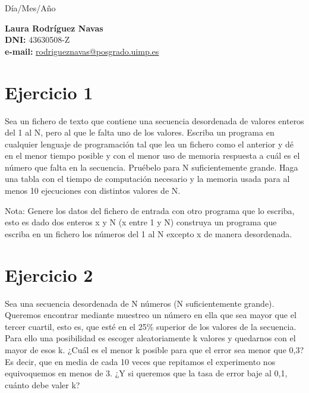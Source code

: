 \documentclass{uimppracticas}
\begin{document}
	
\frontmatter


\begin{center}
	\large Día/Mes/Año
\end{center}

\vspace{30mm}

\begin{flushright}
	{\bf Laura Rodríguez Navas}\\
	\textbf{DNI:} 43630508-Z\\
	\textbf{e-mail:} \href{rodrigueznavas@posgrado.uimp.es}{rodrigueznavas@posgrado.uimp.es}
\end{flushright}

\newpage

\tableofcontents

\newpage

\mainmatter

\section{Ejercicio 1}

Sea un fichero de texto que contiene una secuencia desordenada de valores enteros del 1 al N, pero al que le falta uno de los valores. Escriba un programa en cualquier lenguaje de programación tal que lea un fichero como el anterior y dé en el menor tiempo posible y con el menor uso de memoria respuesta a cuál es el número que falta en la secuencia. Pruébelo para N suficientemente grande. Haga una tabla con el tiempo de computación necesario y la memoria usada para al menos 10 ejecuciones con distintos valores de N.

Nota: Genere los datos del fichero de entrada con otro programa que lo escriba, esto es dado dos enteros x y N (x entre 1 y N) construya un programa que escriba en un fichero los números del 1 al N excepto x de manera desordenada.


\section{Ejercicio 2}

Sea una secuencia desordenada de N números (N suficientemente grande). Queremos encontrar mediante muestreo un número en ella que sea mayor que el tercer cuartil, esto es, que esté en el 25\% superior de los valores de la secuencia. Para ello una posibilidad es escoger aleatoriamente k valores y quedarnos con el mayor de esos k. ¿Cuál es el menor k posible para que el error sea menor que 0,3? Es decir, que en media de cada 10 veces que repitamos el experimento nos equivoquemos en menos de 3. ¿Y si queremos que la tasa de error baje al 0,1, cuánto debe valer k?
\end{document}

